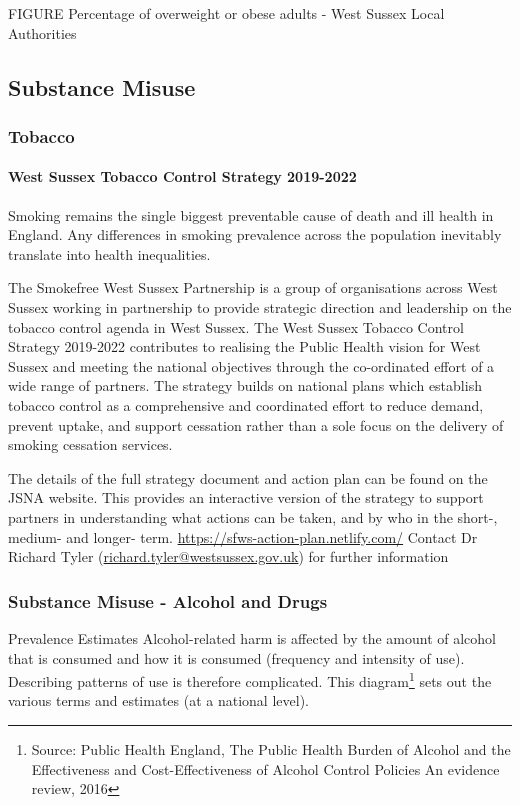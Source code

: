 FIGURE Percentage of overweight or obese adults - West Sussex Local Authorities

\subsection{Substance Misuse}
\subsubsection{Tobacco}
\paragraph{West Sussex Tobacco Control Strategy 2019-2022} Smoking remains the single biggest preventable cause of death and ill health in England. Any differences in smoking prevalence across the population inevitably translate into health inequalities.

The Smokefree West Sussex Partnership is a group of organisations across West Sussex working in partnership to provide strategic direction and leadership on the tobacco control agenda in West Sussex. The West Sussex Tobacco Control Strategy 2019-2022 contributes to realising the Public Health vision for West Sussex and meeting the national objectives through the co-ordinated effort of a wide range of partners. The strategy builds on national plans which establish tobacco control as a comprehensive and coordinated effort to reduce demand, prevent uptake, and support cessation rather than a sole focus on the delivery of smoking cessation services.

The details of the full strategy document and action plan can be found on the JSNA website. This provides an interactive version of the strategy to support partners in understanding what actions can be taken, and by who in the short-, medium- and longer- term. \url{https://sfws-action-plan.netlify.com/} Contact Dr Richard Tyler (\url{richard.tyler@westsussex.gov.uk}) for further information

\subsubsection{Substance Misuse - Alcohol and Drugs} Prevalence Estimates Alcohol-related harm is affected by the amount of alcohol that is consumed and how it is consumed (frequency and intensity of use). Describing patterns of use is therefore complicated. This diagram\footnote{Source: Public Health England, The Public Health Burden of Alcohol and the Effectiveness and Cost-Effectiveness of Alcohol Control Policies An evidence review, 2016} sets out the various terms and estimates (at a national level).

